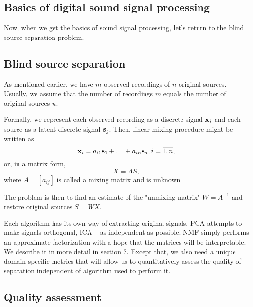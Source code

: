 \documentclass[../main.tex]{subfiles} %
\begin{document}
\subsection{Basics of digital sound signal processing}



Now, when we get the basics of sound signal processing, let's return to the blind source separation problem.

\subsection{Blind source separation}

As mentioned earlier, we have $m$ observed recordings of $n$ original sources. Usually, we assume that the number of recordings $m$ equals the number of original sources $n$.

Formally, we represent each observed recording as a discrete signal ${\mathbf x}_i$ and each source as a latent discrete signal ${\mathbf s}_j$. Then, linear mixing procedure might be written as 
\[ {\mathbf x}_i = a_{i1} {\mathbf s}_1 + \ldots + a_{in} {\mathbf s}_n, i = \overline{1, n}, \]
or, in a matrix form, 
\[ X = A S, \]
where $A = \left[a_{ij} \right]$ is called a mixing matrix and is unknown. 

The problem is then to find an estimate of the "unmixing matrix" $W = A^{-1}$  and restore original sources $S = W X$. 

Each algorithm has its own way of extracting original signals. PCA attempts to make signals orthogonal, ICA -- as independent as possible. NMF simply performs an approximate factorization with a hope that the matrices will be interpretable. We describe it in more detail in section 3. Except that, we also need a unique domain-specific metrics that will allow us to quantitatively assess the quality of separation independent of algorithm used to perform it.

\subsection{Quality assessment}




\end{document}
